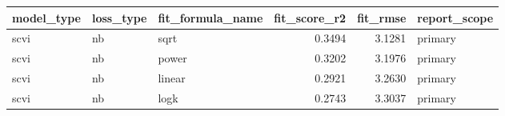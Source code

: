 \begin{tabular}{lllrrl}
\toprule
model\_type & loss\_type & fit\_formula\_name & fit\_score\_r2 & fit\_rmse & report\_scope \\
\midrule
scvi & nb & sqrt & 0.3494 & 3.1281 & primary \\
scvi & nb & power & 0.3202 & 3.1976 & primary \\
scvi & nb & linear & 0.2921 & 3.2630 & primary \\
scvi & nb & logk & 0.2743 & 3.3037 & primary \\
\bottomrule
\end{tabular}
